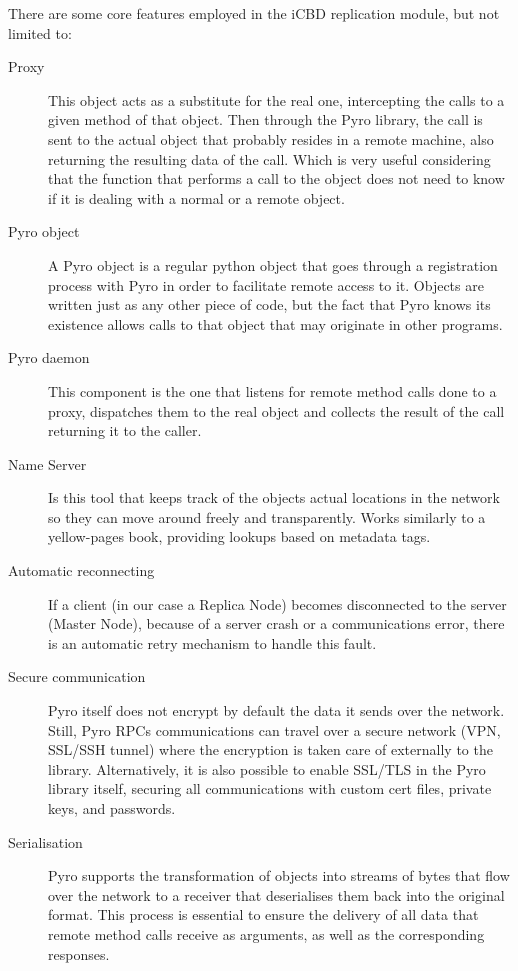 There are some core features employed in the iCBD replication module, but not limited to:


\begin{description}
	\item [Proxy] This object acts as a substitute for the real one, intercepting the calls to a given method of that object. Then through the Pyro library, the call is sent to the actual object that probably resides in a remote machine, also returning the resulting data of the call. Which is very useful considering that the function that performs a call to the object does not need to know if it is dealing with a normal or a remote object.
	\item [Pyro object] A Pyro object is a regular python object that goes through a registration process with Pyro in order to facilitate remote access to it. Objects are written just as any other piece of code, but the fact that Pyro knows its existence allows calls to that object that may originate in other programs.
	\item [Pyro daemon] This component is the one that listens for remote method calls done to a proxy, dispatches them to the real object and collects the result of the call returning it to the caller.
	\item [Name Server] Is this tool that keeps track of the objects actual locations in the network so they can move around freely and transparently. Works similarly to a yellow-pages book, providing lookups based on metadata tags.
	\item [Automatic reconnecting] If a client (in our case a Replica Node) becomes disconnected to the server (Master Node), because of a server crash or a communications error, there is an automatic retry mechanism to handle this fault.
	\item [Secure communication] Pyro itself does not encrypt by default the data it sends over the network. Still, Pyro RPCs communications can travel over a secure network (VPN, SSL/SSH tunnel) where the encryption is taken care of externally to the library. Alternatively, it is also possible to enable SSL/TLS in the Pyro library itself, securing all communications with custom cert files, private keys, and passwords.
	\item [Serialisation] Pyro supports the transformation of objects into streams of bytes that flow over the network to a receiver that deserialises them back into the original format. This process is essential to ensure the delivery of all data that remote method calls receive as arguments, as well as the corresponding responses.
\end{description}


